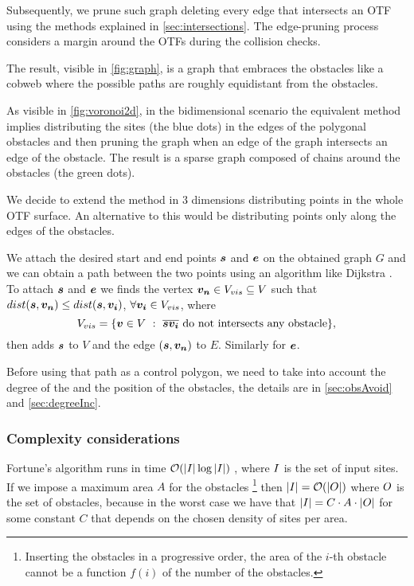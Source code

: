 \documentclass[dissertation.tex]{subfiles}
\begin{document}
Subsequently, we prune such graph deleting every edge that
intersects an \ac{OTF} using the methods explained in
\cref{sec:intersections}. The edge-pruning process considers a margin
around the \acp{OTF} during the collision checks.

The result, visible in \cref{fig:graph}, is a graph that embraces the
obstacles like a cobweb where the possible paths are roughly
equidistant from the obstacles.

As visible
in \cref{fig:voronoi2d},
in the bidimensional scenario the equivalent method implies distributing
the sites (the blue dots) in the edges of the polygonal obstacles and
then pruning the 
graph when an edge of the graph intersects an edge of the
obstacle. The result is a sparse graph composed of chains around the
obstacles (the green dots).

We decide to extend the method in 3 dimensions distributing points in
the whole \ac{OTF} surface. An alternative to this would be distributing
points only along the edges of the obstacles.

We attach the desired start and end
points $\boldsymbol{s}$ and $\boldsymbol{e}$ on the obtained graph $G$ and we can obtain a path between the two points using an
algorithm like Dijkstra \cite{dijkstra}\cite{knuth}. To attach $\boldsymbol{s}$
and $\boldsymbol{e}$ we finds the vertex $\boldsymbol{v_n}\in V_{vis}\subseteq V$ such
  that $dist(\boldsymbol{s},\boldsymbol{v_n})\leq dist(\boldsymbol{s},\boldsymbol{v_i})$, $\forall
  \boldsymbol{v_i}\in V_{vis}$, where
  \begin{equation*}
    V_{vis}=\{\boldsymbol{v}\in V\ :\ \overline{\boldsymbol{s} \boldsymbol{v_i}}\ \text{do not
      intersects any obstacle}\},
  \end{equation*}
  then adds $\boldsymbol{s}$ to $V$ and the edge $(\boldsymbol{s},\boldsymbol{v_n})$ to $E$.
  Similarly for $\boldsymbol{e}$.

Before using that path as a control polygon,
we need to take into account the degree of the \bs and the
position of the obstacles, the details are in \cref{sec:obsAvoid} and
\cref{sec:degreeInc}.

\subsubsection{Complexity considerations}
Fortune's algorithm runs in time $\mathcal{O}(|I|\log |I|)$ \cite{deberg},
where $I$ is
the set 
of input sites. If we impose a maximum area $A$ for the obstacles
\footnote{Inserting the obstacles in a progressive order, the area of the $i$-th
obstacle cannot be a function $f(i)$ of the number of
the obstacles.} then $|I|=\mathcal{O}(|O|)$ where $O$ is the set of
obstacles, because in the worst case we have that $|I|=C\cdot A\cdot
|O|$ for
some constant $C$ that depends on the chosen density of sites per area.
\end{document}
